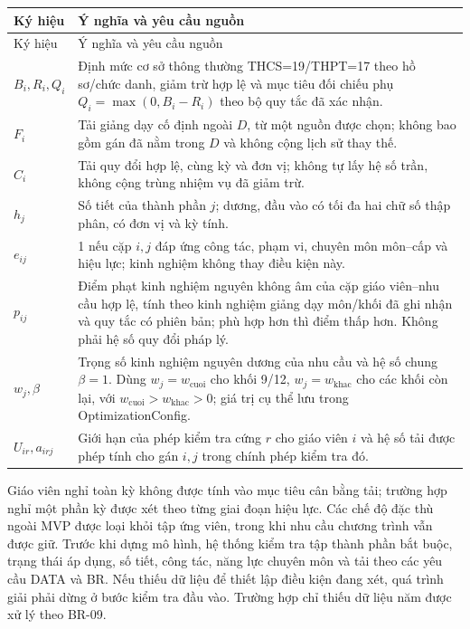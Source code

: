 \documentclass[12pt,a4paper]{report}
\begin{document}
\begin{longtable}{|p{2.3cm}|p{11.6cm}|}\hline
Ký hiệu & Ý nghĩa và yêu cầu nguồn \\\hline\endfirsthead
\hline Ký hiệu & Ý nghĩa và yêu cầu nguồn \\\hline\endhead
$B_i,R_i,Q_i$ & Định mức cơ sở thông thường THCS=19/THPT=17 theo hồ sơ/chức danh, giảm trừ hợp lệ và mục tiêu đối chiếu phụ $Q_i=\max(0,B_i-R_i)$ theo bộ quy tắc đã xác nhận. \\\hline
$F_i$ & Tải giảng dạy cố định ngoài $D$, từ một nguồn được chọn; không bao gồm gán đã nằm trong $D$ và không cộng lịch sử thay thế. \\\hline
$C_i$ & Tải quy đổi hợp lệ, cùng kỳ và đơn vị; không tự lấy hệ số trần, không cộng trùng nhiệm vụ đã giảm trừ. \\\hline
$h_j$ & Số tiết của thành phần $j$; dương, đầu vào có tối đa hai chữ số thập phân, có đơn vị và kỳ tính. \\\hline
$e_{ij}$ & 1 nếu cặp $i,j$ đáp ứng công tác, phạm vi, chuyên môn môn--cấp và hiệu lực; kinh nghiệm không thay điều kiện này. \\\hline
$p_{ij}$ & Điểm phạt kinh nghiệm nguyên không âm của cặp giáo viên--nhu cầu hợp lệ, tính theo kinh nghiệm giảng dạy môn/khối đã ghi nhận và quy tắc có phiên bản; phù hợp hơn thì điểm thấp hơn. Không phải hệ số quy đổi pháp lý. \\\hline
$w_j,\beta$ & Trọng số kinh nghiệm nguyên dương của nhu cầu và hệ số chung $\beta=1$. Dùng $w_j=w_{\mathrm{cuoi}}$ cho khối 9/12, $w_j=w_{\mathrm{khac}}$ cho các khối còn lại, với $w_{\mathrm{cuoi}}>w_{\mathrm{khac}}>0$; giá trị cụ thể lưu trong OptimizationConfig. \\\hline
$U_{ir},a_{irj}$ & Giới hạn của phép kiểm tra cứng $r$ cho giáo viên $i$ và hệ số tải được phép tính cho gán $i,j$ trong chính phép kiểm tra đó. \\\hline
\end{longtable}
Giáo viên nghỉ toàn kỳ không được tính vào mục tiêu cân bằng tải; trường hợp nghỉ một phần kỳ được xét theo từng giai đoạn hiệu lực. Các chế độ đặc thù ngoài MVP được loại khỏi tập ứng viên, trong khi nhu cầu chương trình vẫn được giữ. Trước khi dựng mô hình, hệ thống kiểm tra tập thành phần bắt buộc, trạng thái áp dụng, số tiết, công tác, năng lực chuyên môn và tải theo các yêu cầu DATA và BR. Nếu thiếu dữ liệu để thiết lập điều kiện đang xét, quá trình giải phải dừng ở bước kiểm tra đầu vào. Trường hợp chỉ thiếu dữ liệu năm được xử lý theo BR-09.
\end{document}
